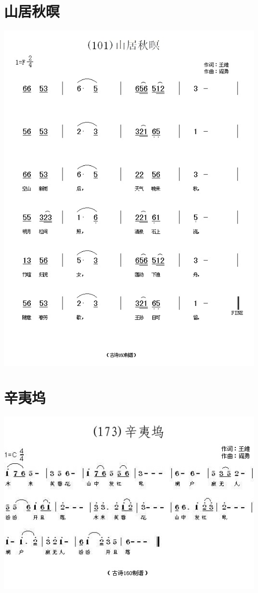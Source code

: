 \documentclass[cn,pad,chinesefont=nofont]{elegantbook}
\begin{document}
\section{山居秋暝}
    \includegraphics[width=\textwidth]{dongxiao/20200627-王维-山居秋暝.jpg} 
\section{辛夷坞}
    \includegraphics[width=\textwidth]{dongxiao/20200627-王维-辛夷坞.jpg} 
\end{document}
